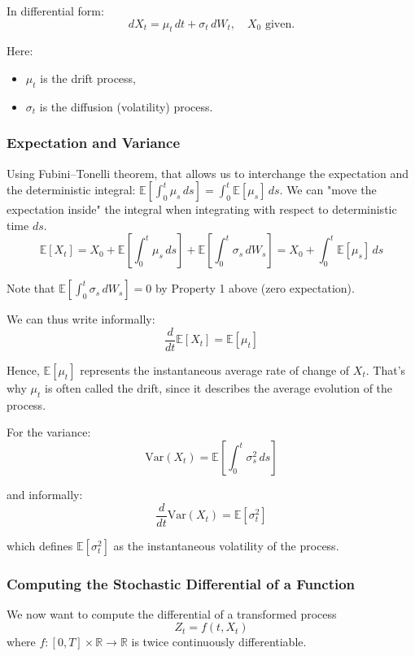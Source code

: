 \documentclass[12pt,a4paper]{article}
\theoremstyle{definition}
\begin{document}
In differential form:
\[
dX_t = \mu_t \, dt + \sigma_t \, dW_t, \quad X_0 \text{ given}.
\]

Here:
\begin{itemize}
\item $\mu_t$ is the drift process,
\item $\sigma_t$ is the diffusion (volatility) process.
\end{itemize}

\subsubsection{Expectation and Variance}

Using Fubini–Tonelli theorem, that allows us to interchange the expectation and the deterministic integral: $\mathbb{E}\left[\int_0^t \mu_s \, ds\right] = \int_0^t \mathbb{E}[\mu_s] \, ds$. We can "move the expectation inside" the integral when integrating with respect to deterministic time $ds$.
\[
\mathbb{E}[X_t] = X_0 + \mathbb{E}\left[\int_0^t \mu_s \, ds\right] + \mathbb{E}\left[\int_0^t \sigma_s \, dW_s\right] = X_0 + \int_0^t \mathbb{E}[\mu_s] \, ds
\]

Note that $\mathbb{E}\left[\int_0^t \sigma_s \, dW_s\right] = 0$ by Property 1 above (zero expectation).



We can thus write informally:
\[
\frac{d}{dt}\mathbb{E}[X_t] = \mathbb{E}[\mu_t]
\]

Hence, $\mathbb{E}[\mu_t]$ represents the instantaneous average rate of change of $X_t$. That's why $\mu_t$ is often called the drift, since it describes the average evolution of the process.

For the variance:
\[
\text{Var}(X_t) = \mathbb{E}\left[\int_0^t \sigma_s^2 \, ds\right]
\]

and informally:
\[
\frac{d}{dt}\text{Var}(X_t) = \mathbb{E}[\sigma_t^2]
\]

which defines $\mathbb{E}[\sigma_t^2]$ as the instantaneous volatility of the process.

\subsubsection{Computing the Stochastic Differential of a Function}

We now want to compute the differential of a transformed process
\[
Z_t = f(t, X_t)
\]
where $f: [0,T] \times \mathbb{R} \to \mathbb{R}$ is twice continuously differentiable.
\end{document}
